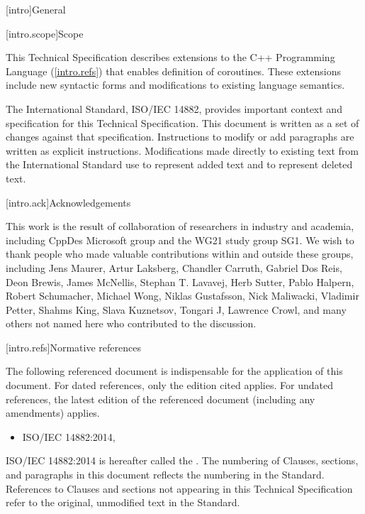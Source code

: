 
[intro]{General}

[intro.scope]{Scope}

\pnum
This Technical Specification describes extensions to the C++ 
Programming Language (\ref{intro.refs}) that
enables definition of coroutines. These extensions include 
new syntactic forms and modifications to existing language semantics.

\pnum
The International Standard, ISO/IEC 14882, provides important context
and specification for this Technical Specification. This document is 
written as a set of changes against that specification. Instructions
to modify or add paragraphs are written as explicit instructions. 
Modifications made directly to existing text from the International
Standard use  to represent added text and
 to represent deleted text.

[intro.ack]{Acknowledgements}

This work is the result of collaboration of researchers in industry and academia, including CppDes Microsoft group and the WG21 study group SG1. We wish to thank people who made valuable contributions within and outside these groups, including Jens Maurer, Artur Laksberg, Chandler Carruth, Gabriel Dos Reis, Deon Brewis, James McNellis, Stephan T. Lavavej, Herb Sutter, Pablo Halpern, Robert Schumacher, Michael Wong, Niklas Gustafsson, Nick Maliwacki, Vladimir Petter, Shahms King, Slava Kuznetsov, Tongari J, Lawrence Crowl, and many others not named here who contributed to
the discussion.

[intro.refs]{Normative references}

\pnum
The following referenced document is indispensable for the
application of this document. For dated references, only the
edition cited applies. For undated references, the latest edition
of the referenced document (including any amendments) applies.

\begin{itemize}
\item ISO/IEC 14882:2014, 
\end{itemize}

ISO/IEC 14882:2014 is hereafter called the .
%
The numbering of Clauses, sections, and paragraphs in this document
reflects the numbering in the \Cpp Standard. References to Clauses
and sections not appearing in this Technical Specification refer to
the original, unmodified text in the \Cpp Standard.

